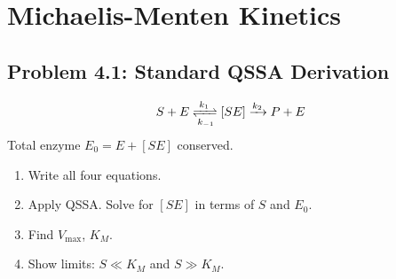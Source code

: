 \documentclass[10pt]{article}
\begin{document}
\newpage
\section{Michaelis-Menten Kinetics}

\subsection{Problem 4.1: Standard QSSA Derivation}

\begin{problem}
\[
S + E \xrightleftharpoons[k_{-1}]{k_1} [SE] \xrightarrow{k_2} P + E
\]
Total enzyme $E_0 = E + [SE]$ conserved.
\begin{enumerate}[label=(\alph*)]
\item Write all four equations.
\item Apply QSSA. Solve for $[SE]$ in terms of $S$ and $E_0$.
\item Find $V_\text{max}$, $K_M$.
\item Show limits: $S \ll K_M$ and $S \gg K_M$.
\end{enumerate}
\end{problem}
\end{document}

